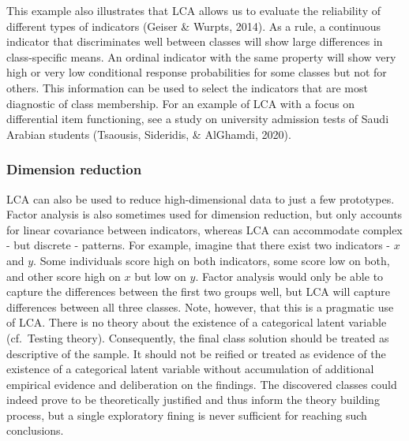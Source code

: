 \documentclass[
  ,man,floatsintext]{apa6}
\begin{document}
This example also illustrates that LCA allows us to evaluate the reliability of different types of indicators (Geiser \& Wurpts, 2014).
As a rule, a continuous indicator that discriminates well between classes will show large differences in class-specific means. An ordinal indicator with the same property will show very high or very low conditional response probabilities for some classes but not for others.
This information can be used to select the indicators that are most diagnostic of class membership.
For an example of LCA with a focus on differential item functioning,
see a study on university admission tests of Saudi Arabian students (Tsaousis, Sideridis, \& AlGhamdi, 2020).

\hypertarget{dimension-reduction}{%
\subsubsection{Dimension reduction}\label{dimension-reduction}}

LCA can also be used to reduce high-dimensional data
to just a few prototypes.
Factor analysis is also sometimes used for dimension reduction,
but only accounts for linear covariance between indicators,
whereas LCA can accommodate complex - but discrete - patterns.
For example, imagine that there exist two indicators - \(x\) and \(y\). Some individuals score high on both indicators, some score low on both, and other score high on \(x\) but low on \(y\).
Factor analysis would only be able to capture the differences between the first two groups well, but LCA will capture differences between all three classes. Note, however, that this is a pragmatic use of LCA. There is no theory about the existence of a categorical latent variable (cf.~Testing theory).
Consequently, the final class solution should be treated as descriptive of the sample.
It should not be reified or treated as evidence of the existence of a categorical latent variable without accumulation of additional empirical evidence and deliberation on the findings. The discovered classes could indeed prove to be theoretically justified and thus inform the theory building process, but a single exploratory fining is never sufficient for reaching such conclusions.
\end{document}
